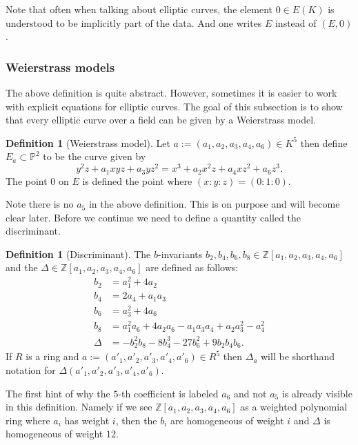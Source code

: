 \documentclass[a4paper,12pt,reqno]{amsart}
\newcommand{\field}[1]{\mathbb{#1}}  %
\newcommand{\Z}{\field{Z}} %
\renewcommand{\P}{\field{P}}
\theoremstyle{definition}
\newtheorem{definition}[lemma]{Definition}
\numberwithin{lemma}{section}
\numberwithin{equation}{section}
\numberwithin{figure}{section}
\begin{document}
Note that often when talking about elliptic curves, the element $0 \in E(K)$ is understood to be implicitly part of the data. And one writes $E$ instead of $(E,0)$.

\subsubsection{Weierstrass models}\label{sec:weierstrass-over-K}
The above definition is quite abstract. However, sometimes it is easier to work with explicit equations for elliptic curves. The goal of this subsection is to show that every elliptic curve over a field can be given by a Weierstrass model.

\begin{definition}[Weierstrass model]\label{def:weierstrass-model-over-K}
Let $a := (a_1,a_2,a_3,a_4,a_6) \in K^5$ then define $E_{a} \subset \P^2$ to be the curve given by
$$y^2z+ a_1xyz+a_3yz^2=x^3+a_2x^2z+a_4xz^2+a_6z^3.$$
The point $0$ on $E$ is defined the point where $(x:y:z) = (0:1:0)$.
\end{definition}



Note there is no $a_5$ in the above definition. This is on purpose and will become clear later.
Before we continue we need to define a quantity called the discriminant.
\begin{definition}[Discriminant]\label{def:weierstrass-discriminant}
The $b$-invariants $b_2,b_4,b_6,b_8 \in \Z[a_1,a_2,a_3,a_4,a_6]$ and the  $\Delta \in \Z[a_1,a_2,a_3,a_4,a_6]$ are defined as follows:
\begin{align*}
b_2 &= a_1^2 + 4 a_2 \\
b_4 &= 2a_4 + a_1 a_3 \\
b_6 &= a_3^2 + 4 a_6 \\
b_8 &= a_1^2 a_6 + 4a_2 a_6 - a_1 a_3 a_4 + a_2 a_3^2 - a_4^2 \\
\Delta &= -b_2^2 b_8 - 8b_4^3 - 27b_6^2 + 9b_2 b_4 b_6.
\end{align*}
If $R$ is a ring and $a := (a'_1,a'_2,a'_3,a'_4,a'_6) \in R^5$ then $\Delta_a$ will be shorthand notation for $\Delta(a'_1,a'_2,a'_3,a'_4,a'_6)$.
\end{definition}
The first hint of why the $5$-th coefficient is labeled $a_6$ and not $a_5$ is already visible in this definition. Namely if we see $\Z[a_1,a_2,a_3,a_4,a_6]$ as a weighted polynomial ring where $a_i$ has weight $i$, then the $b_i$ are homogeneous of weight $i$ and $\Delta$ is homogeneous of weight $12$.
\end{document}
